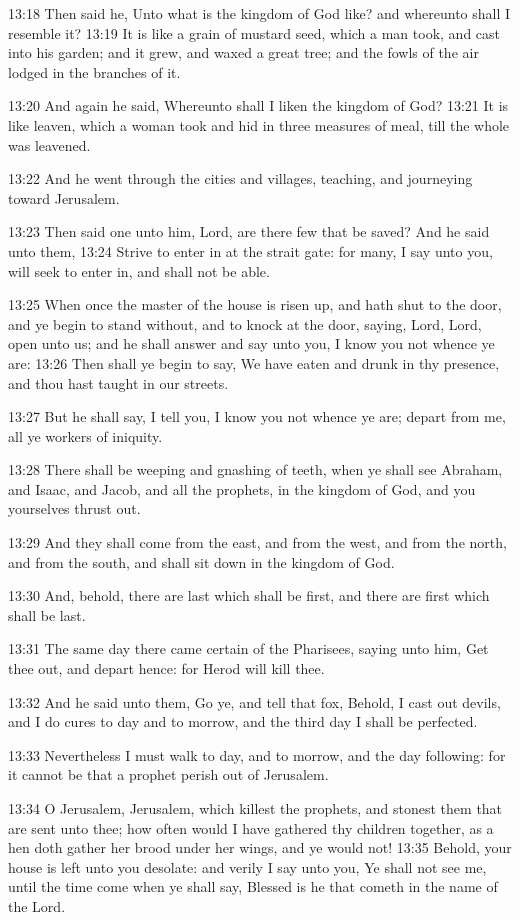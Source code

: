 13:18 Then said he, Unto what is the kingdom of God like? and
whereunto shall I resemble it?  13:19 It is like a grain of mustard
seed, which a man took, and cast into his garden; and it grew, and
waxed a great tree; and the fowls of the air lodged in the branches of
it.

13:20 And again he said, Whereunto shall I liken the kingdom of God?
13:21 It is like leaven, which a woman took and hid in three measures
of meal, till the whole was leavened.

13:22 And he went through the cities and villages, teaching, and
journeying toward Jerusalem.

13:23 Then said one unto him, Lord, are there few that be saved? And
he said unto them, 13:24 Strive to enter in at the strait gate: for
many, I say unto you, will seek to enter in, and shall not be able.

13:25 When once the master of the house is risen up, and hath shut to
the door, and ye begin to stand without, and to knock at the door,
saying, Lord, Lord, open unto us; and he shall answer and say unto
you, I know you not whence ye are: 13:26 Then shall ye begin to say,
We have eaten and drunk in thy presence, and thou hast taught in our
streets.

13:27 But he shall say, I tell you, I know you not whence ye are;
depart from me, all ye workers of iniquity.

13:28 There shall be weeping and gnashing of teeth, when ye shall see
Abraham, and Isaac, and Jacob, and all the prophets, in the kingdom of
God, and you yourselves thrust out.

13:29 And they shall come from the east, and from the west, and from
the north, and from the south, and shall sit down in the kingdom of
God.

13:30 And, behold, there are last which shall be first, and there are
first which shall be last.

13:31 The same day there came certain of the Pharisees, saying unto
him, Get thee out, and depart hence: for Herod will kill thee.

13:32 And he said unto them, Go ye, and tell that fox, Behold, I cast
out devils, and I do cures to day and to morrow, and the third day I
shall be perfected.

13:33 Nevertheless I must walk to day, and to morrow, and the day
following: for it cannot be that a prophet perish out of Jerusalem.

13:34 O Jerusalem, Jerusalem, which killest the prophets, and stonest
them that are sent unto thee; how often would I have gathered thy
children together, as a hen doth gather her brood under her wings, and
ye would not!  13:35 Behold, your house is left unto you desolate: and
verily I say unto you, Ye shall not see me, until the time come when
ye shall say, Blessed is he that cometh in the name of the Lord.

